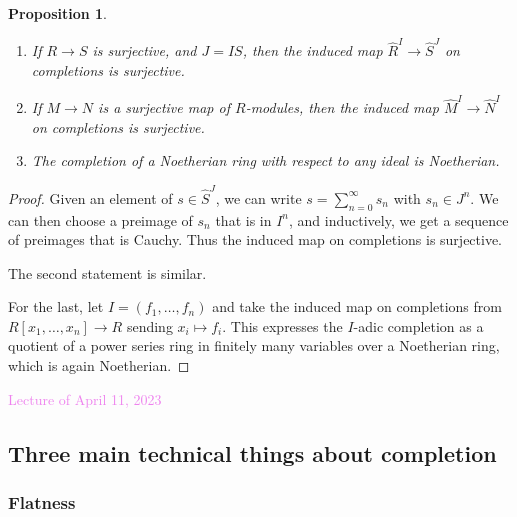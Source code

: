 \documentclass{amsart}[12pt]
\newcommand{\Apr}[1]{\textcolor{violet}{Lecture of April #1, 2023}}
\numberwithin{equation}{section}
\theoremstyle{plain} %
\newtheorem{prop}[equation]{Proposition}
\theoremstyle{definition}
\theoremstyle{remark}
\begin{document}
 
 
 


 

\begin{prop} 
\begin{enumerate}
\item If $R \to S$ is surjective, and $J=IS$, then the induced map $\hat{R}^I\to \hat{S}^J$ on completions is surjective.
\item If $M\to N$ is a surjective map of $R$-modules, then the induced map $\hat{M}^I \to \hat{N}^I$ on completions is surjective.
\item The completion of a Noetherian ring with respect to any ideal is Noetherian.
\end{enumerate}
\end{prop}
\begin{proof} Given an element of $s\in\hat{S}^J$, we can write $s = \sum_{n=0}^\infty s_n$ with $s_n\in J^n$. We can then choose a preimage of $s_n$ that is in $I^n$, and inductively, we get a sequence of preimages that is Cauchy. Thus the induced map on completions is surjective.

The second statement is similar.

For the last, let $I=(f_1,\dots,f_n)$ and take the induced map on completions from $R[x_1,\dots,x_n] \to R$ sending $x_i\mapsto f_i$. This expresses the $I$-adic completion as a quotient of a power series ring in finitely many variables over a Noetherian ring, which is again Noetherian.
\end{proof}


\Apr{11}

 \subsection{Three main technical things about completion}
 
 \subsubsection{Flatness}
 
\end{document}
